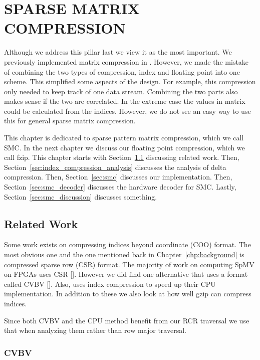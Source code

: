 \chapter{SPARSE MATRIX COMPRESSION}
\label{chp:compression}

Although we address this pillar last we view it as the most important. We previously implemented matrix compression in \cite{prelim:townsend}. However, we made the mistake of combining the two types of compression, index and floating point into one scheme. This simplified some aspects of the design. For example, this compression only needed to keep track of one data stream. Combining the two parts also makes sense if the two are correlated. In the extreme case the values in matrix could be calculated from the indices. However, we do not see an easy way to use this for general sparse matrix compression.

This chapter is dedicated to sparse pattern matrix compression, which we call SMC. In the next chapter we discuss our floating point compression, which we call fzip. This chapter starts with Section~\ref{sec:index_compression_related_work} discussing related work. Then, Section~\ref{sec:index_compression_analysis} discusses the analysis of delta compression. Then, Section~\ref{sec:smc} discusses our implementation. Then, Section~\ref{sec:smc_decoder} discusses the hardware decoder for SMC. Lastly, Section~\ref{sec:smc_discussion} discusses something.

\section{Related Work}
\label{sec:index_compression_related_work}
Some work exists on compressing indices beyond coordinate (COO) format. The most obvious one and the one mentioned back in Chapter~\ref{chp:background} is compressed sparse row (CSR) format. The majority of work on computing SpMV on FPGAs uses CSR [\cite{prelim:nagar1}]. However we did find one alternative that uses a format called CVBV [\cite{prelim:kestur}]. Also, \cite{prelim:kourtis} uses index compression to speed up their CPU implementation. In addition to these we also look at how well gzip can compress indices.

Since both CVBV and the CPU method benefit from our RCR traversal we use that when analyzing them rather than row major traversal.
\subsection{CVBV}

